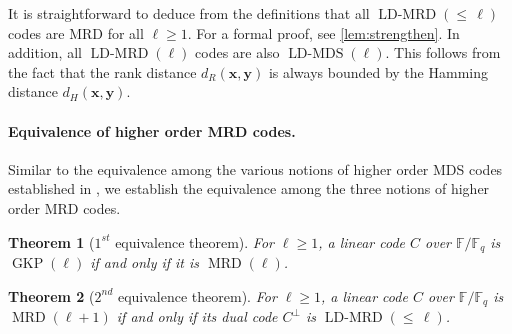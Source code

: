 \documentclass[11pt]{article}
\theoremstyle{plain}
\newtheorem{thm}{Theorem}[section]
\theoremstyle{definition}
\theoremstyle{remark}
\newcommand{\ldmrd}[1]{\operatorname{LD-MRD}({\leq}\,#1)}
\newcommand{\F}{\mathbb{F}}
\newcommand{\by}{\bm{y}}
\newcommand{\bx}{\bm{x}}
\renewcommand{\epsilon}{\varepsilon}
\begin{document}
It is straightforward to deduce from the definitions that all 
$\ldmrd{\ell}$ codes are MRD for all $\ell\geq 1$. For a formal proof, see \cref{lem:strengthen}. In addition, all $\operatorname{LD-MRD}(\ell)$ codes are also $\operatorname{LD-MDS}(\ell)$. 
This follows from the fact that the rank distance $d_R(\bx,\by)$ is always bounded by the Hamming distance $d_H(\bx,\by)$.



\paragraph{Equivalence of higher order MRD codes.} 

Similar to the equivalence among the various notions of higher order MDS codes established in \cite{brakensiek2023generic}, we establish the equivalence among the three notions of higher order MRD codes.

\begin{thm}[$1^{st}$ equivalence theorem]\label{1equiv}
For $\ell\ge 1$, a linear code $C$ over $\F/\F_q$ is $\operatorname{GKP}(\ell)$ if and only if it is $\operatorname{MRD}(\ell)$.
\end{thm}

\begin{thm}[$2^{nd}$ equivalence theorem]\label{2equiv} 
For $\ell\ge 1$, a linear code $C$ over $\F/\F_q$ is $\operatorname{MRD}(\ell+1)$ if and only if its dual code $C^{\perp}$ is $\ldmrd{\ell}$.
\end{thm}
\end{document}
